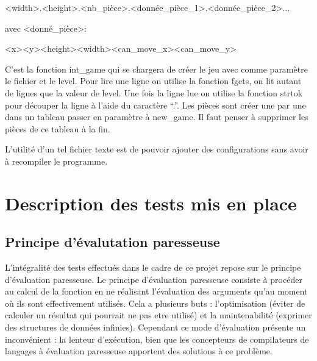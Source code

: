 \documentclass{report}
\begin{document}
\begin{verbatimtab}[10]
<width>.<height>.<nb_pièce>.<donnée_pièce_1>.<donnée_pièce_2>...
\end{verbatimtab}

\noindent
avec <donné\_pièce>:

\begin{verbatimtab}[10]
<x><y><height><width><can_move_x><can_move_y>
\end{verbatimtab}

C'est la fonction int\_game qui se chargera de créer le jeu avec comme paramètre le fichier et le level. Pour lire une ligne on utilise la fonction fgets, on lit autant de lignes que la valeur de level. Une fois la ligne lue on utilise la fonction strtok pour découper la ligne à l'aide du caractère ``.''. Les pièces sont créer une par une dans un tableau passer en paramètre à new\_game. Il faut penser à supprimer les pièces de ce tableau à la fin.

L'utilité d'un tel fichier texte est de pouvoir ajouter des configurations sans avoir à recompiler le programme.

\chapter{Description des tests mis en place}

\section{Principe d'évalutation paresseuse}
\label{Lexa}
L'intégralité des tests effectués dans le cadre de ce projet repose sur le principe d'évaluation paresseuse. Le principe d'évaluation paresseuse consiste à procéder au calcul de la fonction en ne réalisant l'évaluation des arguments qu'au moment où ils sont effectivement utilisés. Cela a plusieurs buts : l'optimisation (éviter de calculer un résultat qui pourrait ne pas etre utilisé) et la maintenabilité (exprimer des structures de données infinies). Cependant ce mode d'évaluation présente un inconvénient : la lenteur d'exécution, bien que les concepteurs de compilateurs de langages à évaluation paresseuse apportent des solutions à ce problème.
\end{document}
